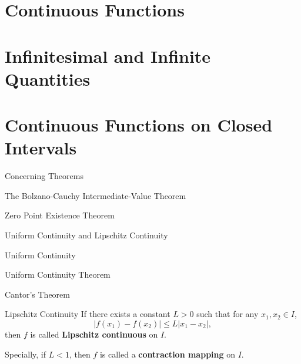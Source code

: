 \documentclass[11pt]{../../TexTemplate/elegantbook}
\begin{document}
\section{Continuous Functions}

\section{Infinitesimal and Infinite Quantities}

\section{Continuous Functions on Closed Intervals}
\begin{leftbarTitle}{Concerning Theorems}\end{leftbarTitle}


\begin{theorem}{The Bolzano-Cauchy Intermediate-Value Theorem}\label{thm:Indeterminate Value Theorem}

\end{theorem}

\begin{theorem}{Zero Point Existence Theorem}\label{thm:Zero Point Existence Theorem}

\end{theorem}

\begin{leftbarTitle}{Uniform Continuity and Lipschitz Continuity}\end{leftbarTitle}

\begin{definition}{Uniform Continuity}
    
\end{definition}

\begin{theorem}{Uniform Continuity Theorem}
    
\end{theorem}


\begin{theorem}{Cantor's Theorem}
    
\end{theorem}


\begin{definition}{Lipschitz Continuity}\label{def:Lipschitz Continuity}
    If there exists a constant \(L > 0\) such that for any \(x_1, x_2 \in I\), 
    \[
        \left| f(x_{1}) - f(x_{2}) \right| \leq L \left| x_{1} - x_{2} \right|,
    \]
    then \(f\) is called \textbf{Lipschitz continuous} on \(I\).

    Specially, if \(L < 1\), then \(f\) is called a \textbf{contraction mapping} on \(I\).
\end{definition}
\end{document}
